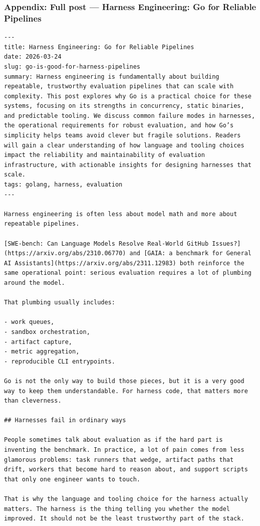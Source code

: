 \documentclass[aspectratio=169]{beamer}
\begin{document}
\begin{frame}[fragile]
\frametitle{Appendix: Full post — Harness Engineering: Go for Reliable Pipelines}
\begin{verbatim}
---
title: Harness Engineering: Go for Reliable Pipelines
date: 2026-03-24
slug: go-is-good-for-harness-pipelines
summary: Harness engineering is fundamentally about building repeatable, trustworthy evaluation pipelines that can scale with complexity. This post explores why Go is a practical choice for these systems, focusing on its strengths in concurrency, static binaries, and predictable tooling. We discuss common failure modes in harnesses, the operational requirements for robust evaluation, and how Go’s simplicity helps teams avoid clever but fragile solutions. Readers will gain a clear understanding of how language and tooling choices impact the reliability and maintainability of evaluation infrastructure, with actionable insights for designing harnesses that scale.
tags: golang, harness, evaluation
---

Harness engineering is often less about model math and more about repeatable pipelines.

[SWE-bench: Can Language Models Resolve Real-World GitHub Issues?](https://arxiv.org/abs/2310.06770) and [GAIA: a benchmark for General AI Assistants](https://arxiv.org/abs/2311.12983) both reinforce the same operational point: serious evaluation requires a lot of plumbing around the model.

That plumbing usually includes:

- work queues,
- sandbox orchestration,
- artifact capture,
- metric aggregation,
- reproducible CLI entrypoints.

Go is not the only way to build those pieces, but it is a very good way to keep them understandable. For harness code, that matters more than cleverness.

## Harnesses fail in ordinary ways

People sometimes talk about evaluation as if the hard part is inventing the benchmark. In practice, a lot of pain comes from less glamorous problems: task runners that wedge, artifact paths that drift, workers that become hard to reason about, and support scripts that only one engineer wants to touch.

That is why the language and tooling choice for the harness actually matters. The harness is the thing telling you whether the model improved. It should not be the least trustworthy part of the stack.


\end{verbatim}
\end{frame}
\end{document}
